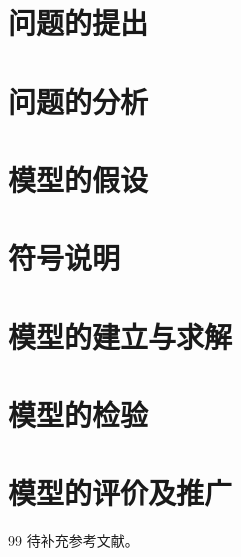 \documentclass{JXUSTmodeling}
\begin{document}
\begin{abstract}
  
\end{abstract}
\section{问题的提出}\label{sec:1}


\section{问题的分析}\label{sec:2}


\section{模型的假设}\label{sec:3}


\section{符号说明}\label{sec:4}


\section{模型的建立与求解}\label{sec:5}






\section{模型的检验}\label{sec:6}


\section{模型的评价及推广}\label{sec:7}


\begin{thebibliography}{99}
  待补充参考文献。
\end{thebibliography}

\begin{appendixx}
  
  
\end{appendixx}
\end{document}
